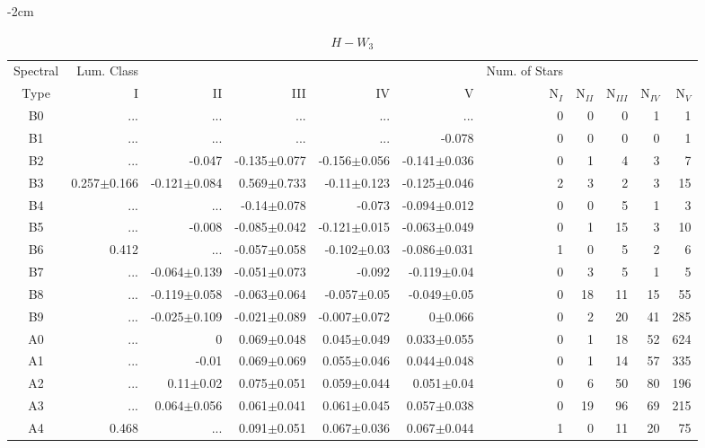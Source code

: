 \begin{table}[t]
\tiny
\centering
\caption{$H-W_{3}$}
\begin{center}
    \addtolength{\leftskip} {-2cm}
    \addtolength{\rightskip}{-2cm}
    \begin{tabular}{c|rrrrr|rrrrr}
    \toprule
    Spectral & Lum. Class & & & & & Num. of Stars & & & &  \\
    Type & I & II & III &  IV & V & N$_{I}$ & N$_{II}$ & N$_{III}$ & N$_{IV}$ & N$_{V}$ \\ \midrule
  
B0	&	 ...	&	 ...	&	 ...	&	 ...	&	 ...	&	0	&	0	&	0	&	1	&	1	\\
B1	&	 ...	&	 ...	&	 ...	&	 ...	&	-0.078	&	0	&	0	&	0	&	0	&	1	\\
B2	&	 ...	&	-0.047	&	-0.135$\pm$0.077	&	-0.156$\pm$0.056	&	-0.141$\pm$0.036	&	0	&	1	&	4	&	3	&	7	\\
B3	&	0.257$\pm$0.166	&	-0.121$\pm$0.084	&	0.569$\pm$0.733	&	-0.11$\pm$0.123	&	-0.125$\pm$0.046	&	2	&	3	&	2	&	3	&	15	\\
B4	&	 ...	&	 ...	&	-0.14$\pm$0.078	&	-0.073	&	-0.094$\pm$0.012	&	0	&	0	&	5	&	1	&	3	\\
B5	&	 ...	&	-0.008	&	-0.085$\pm$0.042	&	-0.121$\pm$0.015	&	-0.063$\pm$0.049	&	0	&	1	&	15	&	3	&	10	\\
B6	&	0.412	&	 ...	&	-0.057$\pm$0.058	&	-0.102$\pm$0.03	&	-0.086$\pm$0.031	&	1	&	0	&	5	&	2	&	6	\\
B7	&	 ...	&	-0.064$\pm$0.139	&	-0.051$\pm$0.073	&	-0.092	&	-0.119$\pm$0.04	&	0	&	3	&	5	&	1	&	5	\\
B8	&	 ...	&	-0.119$\pm$0.058	&	-0.063$\pm$0.064	&	-0.057$\pm$0.05	&	-0.049$\pm$0.05	&	0	&	18	&	11	&	15	&	55	\\
B9	&	 ...	&	-0.025$\pm$0.109	&	-0.021$\pm$0.089	&	-0.007$\pm$0.072	&	0$\pm$0.066	&	0	&	2	&	20	&	41	&	285	\\
A0	&	 ...	&	0	&	0.069$\pm$0.048	&	0.045$\pm$0.049	&	0.033$\pm$0.055	&	0	&	1	&	18	&	52	&	624	\\
A1	&	 ...	&	-0.01	&	0.069$\pm$0.069	&	0.055$\pm$0.046	&	0.044$\pm$0.048	&	0	&	1	&	14	&	57	&	335	\\
A2	&	 ...	&	0.11$\pm$0.02	&	0.075$\pm$0.051	&	0.059$\pm$0.044	&	0.051$\pm$0.04	&	0	&	6	&	50	&	80	&	196	\\
A3	&	 ...	&	0.064$\pm$0.056	&	0.061$\pm$0.041	&	0.061$\pm$0.045	&	0.057$\pm$0.038	&	0	&	19	&	96	&	69	&	215	\\
A4	&	0.468	&	 ...	&	0.091$\pm$0.051	&	0.067$\pm$0.036	&	0.067$\pm$0.044	&	1	&	0	&	11	&	20	&	75	\\

\end{tabular}
\end{center}
\end{table}

